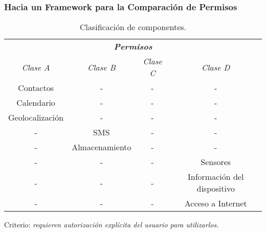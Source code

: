\begin{frame}
 \frametitle{Hacia un Framework para la Comparación de Permisos}
  \begin{table}[H]
    \centering
    \begin{small}
	\begin{tabular}{c c c c}
		\hline
		\multicolumn{4}{c}{\emph{\textbf{Permisos}}} \\
		\emph{Clase A} 	& \emph{Clase B}	 & \emph{Clase C}    & \emph{Clase D}\\ \hline \hline
    Contactos    & -    & -    & -\\
    Calendario    & -    & -    & -\\
    Geolocalización    & -    & -    & -\\
    -    & SMS & -    & -\\
    -    & Almacenamiento    & -    & -\\
    -    & -    & -    & Sensores\\
    -    & -    & -    & Información del dispositivo\\
    -    & -    & -    & Acceso a Internet\\ \hline
	\end{tabular}
    \caption{Clasificación de componentes.}
	\end{small}
  \end{table}\pause
  \begin{block}{}\centering
    {Criterio: \emph{requieren autorización explícita del usuario para utilizarlos.}}  
  \end{block}
\end{frame}